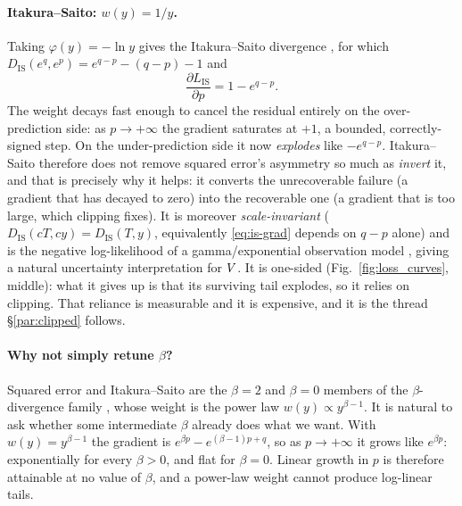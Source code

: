 \paragraph{Itakura--Saito: $w(y)=1/y$.}
Taking $\varphi(y)=-\ln y$ gives the Itakura--Saito divergence
\citep{itakura1968analysis}, for which
$D_{\mathrm{IS}}(e^{q},e^{p}) = e^{q-p}-(q-p)-1$ and
\begin{equation}
  \frac{\partial L_{\mathrm{IS}}}{\partial p}=1-e^{q-p}.
  \label{eq:is-grad}
\end{equation}
The weight decays fast enough to cancel the residual entirely on the
over-prediction side: as $p\to+\infty$ the gradient saturates at $+1$, a
bounded, correctly-signed step. On the under-prediction side it now
\emph{explodes} like $-e^{q-p}$. Itakura--Saito therefore does not remove
squared error's asymmetry so much as \emph{invert} it, and that is precisely
why it helps: it converts the unrecoverable failure (a gradient that has
decayed to zero) into the recoverable one (a gradient that is too large, which
clipping fixes). It is moreover \emph{scale-invariant}
($D_{\mathrm{IS}}(cT,cy)=D_{\mathrm{IS}}(T,y)$, equivalently \eqref{eq:is-grad}
depends on $q-p$ alone) and is the negative log-likelihood of a
gamma/exponential observation model \citep{fevotte2009isnmf}, giving a natural
uncertainty interpretation for $V$. It is one-sided
(Fig.~\ref{fig:loss_curves}, middle): what it gives up is that its surviving
tail explodes, so it relies on clipping. That reliance is measurable and it is
expensive, and it is the thread \S\ref{par:clipped} follows.

\paragraph{Why not simply retune $\beta$?}
Squared error and Itakura--Saito are the $\beta=2$ and $\beta=0$ members of the
$\beta$-divergence family \citep{fevotte2011beta,cichocki2010families}, whose
weight is the power law $w(y)\propto y^{\beta-1}$. It is natural to ask whether
some intermediate $\beta$ already does what we want. With $w(y)=y^{\beta-1}$
the gradient is $e^{\beta p}-e^{(\beta-1)p+q}$, so as $p\to+\infty$ it grows
like $e^{\beta p}$: exponentially for every $\beta>0$, and flat for $\beta=0$.
Linear growth in $p$ is therefore attainable at no value of $\beta$, and a
power-law weight cannot produce log-linear tails.

